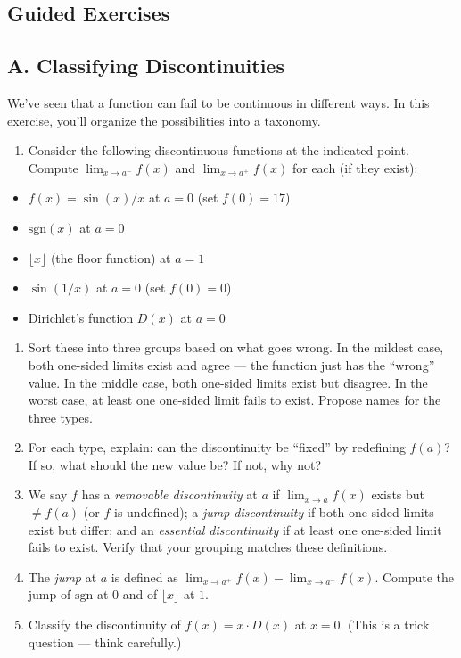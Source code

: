 \documentclass[
  10pt,
  letterpaper,
]{scrbook}
\providecommand{\tightlist}{%
  \setlength{\itemsep}{0pt}\setlength{\parskip}{0pt}}
\begin{document}
\subsection{Guided Exercises}\label{guided-exercises-13}

\subsection{A. Classifying
Discontinuities}\label{a.-classifying-discontinuities}

We've seen that a function can fail to be continuous in different ways.
In this exercise, you'll organize the possibilities into a taxonomy.

\begin{enumerate}
\def\labelenumi{(\alph{enumi})}
\tightlist
\item
  Consider the following discontinuous functions at the indicated point.
  Compute \(\lim_{x \to a^-} f(x)\) and \(\lim_{x \to a^+} f(x)\) for
  each (if they exist):
\end{enumerate}

\begin{itemize}
\tightlist
\item
  \(f(x) = \sin(x)/x\) at \(a = 0\) (set \(f(0) = 17\))
\item
  \(\text{sgn}(x)\) at \(a = 0\)
\item
  \(\lfloor x \rfloor\) (the floor function) at \(a = 1\)
\item
  \(\sin(1/x)\) at \(a = 0\) (set \(f(0) = 0\))
\item
  Dirichlet's function \(D(x)\) at \(a = 0\)
\end{itemize}

\begin{enumerate}
\def\labelenumi{(\alph{enumi})}
\setcounter{enumi}{1}
\item
  Sort these into three groups based on what goes wrong. In the mildest
  case, both one-sided limits exist and agree --- the function just has
  the ``wrong'' value. In the middle case, both one-sided limits exist
  but disagree. In the worst case, at least one one-sided limit fails to
  exist. Propose names for the three types.
\item
  For each type, explain: can the discontinuity be ``fixed'' by
  redefining \(f(a)\)? If so, what should the new value be? If not, why
  not?
\item
  We say \(f\) has a \emph{removable discontinuity} at \(a\) if
  \(\lim_{x \to a} f(x)\) exists but \(\neq f(a)\) (or \(f\) is
  undefined); a \emph{jump discontinuity} if both one-sided limits exist
  but differ; and an \emph{essential discontinuity} if at least one
  one-sided limit fails to exist. Verify that your grouping matches
  these definitions.
\item
  The \emph{jump} at \(a\) is defined as
  \(\lim_{x \to a^+} f(x) - \lim_{x \to a^-} f(x)\). Compute the jump of
  \(\text{sgn}\) at \(0\) and of \(\lfloor x \rfloor\) at \(1\).
\item
  Classify the discontinuity of \(f(x) = x \cdot D(x)\) at \(x = 0\).
  (This is a trick question --- think carefully.)
\end{enumerate}
\end{document}
